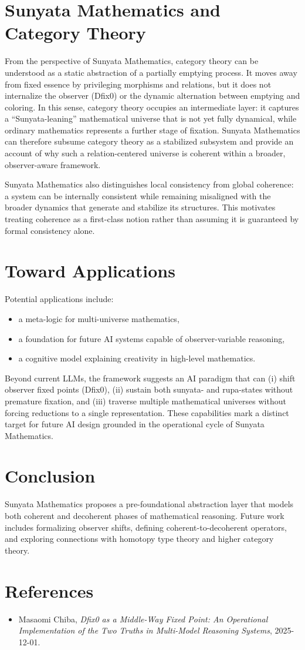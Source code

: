 \documentclass[11pt]{article}
\begin{document}
\section{Sunyata Mathematics and Category Theory}
From the perspective of Sunyata Mathematics, category theory can be understood as a static abstraction of a partially emptying process.
It moves away from fixed essence by privileging morphisms and relations, but it does not internalize the observer (Dfix0) or the
dynamic alternation between emptying and coloring.
In this sense, category theory occupies an intermediate layer: it captures a ``Sunyata-leaning'' mathematical universe that is
not yet fully dynamical, while ordinary mathematics represents a further stage of fixation.
Sunyata Mathematics can therefore subsume category theory as a stabilized subsystem and provide an account of why such a
relation-centered universe is coherent within a broader, observer-aware framework.

Sunyata Mathematics also distinguishes local consistency from global coherence: a system can be internally consistent while
remaining misaligned with the broader dynamics that generate and stabilize its structures. This motivates treating coherence
as a first-class notion rather than assuming it is guaranteed by formal consistency alone.

\section{Toward Applications}
Potential applications include:

\begin{itemize}
    \item a meta-logic for multi-universe mathematics,
    \item a foundation for future AI systems capable of observer-variable reasoning,
    \item a cognitive model explaining creativity in high-level mathematics.
\end{itemize}

Beyond current LLMs, the framework suggests an AI paradigm that can (i) shift observer fixed points (Dfix0),
(ii) sustain both sunyata- and rupa-states without premature fixation, and (iii) traverse multiple mathematical universes
without forcing reductions to a single representation. These capabilities mark a distinct target for future AI design
grounded in the operational cycle of Sunyata Mathematics.

\section{Conclusion}
Sunyata Mathematics proposes a pre-foundational abstraction layer that models both coherent and decoherent phases of mathematical reasoning. Future work includes formalizing observer shifts, defining coherent-to-decoherent operators, and exploring connections with homotopy type theory and higher category theory.

\section*{References}
\begin{itemize}
    \item Masaomi Chiba, \emph{Dfix0 as a Middle-Way Fixed Point: An Operational Implementation of the Two Truths in Multi-Model Reasoning Systems}, 2025-12-01.
\end{itemize}
\end{document}
